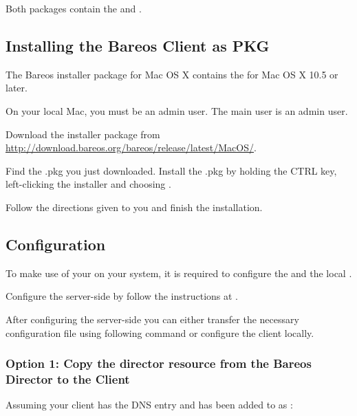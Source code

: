 Both packages contain the \bareosFd and .

%

\subsection{Installing the Bareos Client as PKG}

The Bareos installer package for Mac OS X contains the \bareosFd for Mac OS X 10.5 or later.

On your local Mac, you must be an admin user. The main user is an admin user.

Download the  installer package from \url{http://download.bareos.org/bareos/release/latest/MacOS/}.

Find the .pkg you just downloaded.
Install the .pkg by holding the CTRL key, left-clicking the installer and choosing .

Follow the directions given to you and finish the installation.

\subsection{Configuration}

To make use of your \bareosFd on your system, it is required to configure the \bareosDir and the local \bareosFd.

Configure the server-side by follow the instructions at .

After configuring the server-side you can either
transfer the necessary configuration file using following command
or configure the client locally.


\subsubsection{Option 1: Copy the director resource from the Bareos Director to the Client}

Assuming your client has the DNS entry
 and has been added to \bareosDir as :

